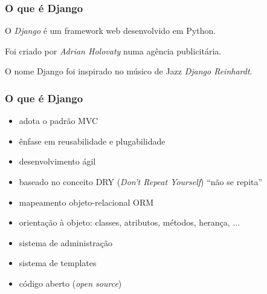 \documentclass[aspectratio=169]{beamer}
\begin{document}
		 
		 

\begin{frame}\frametitle{O que \'e Django}
	O \emph{Django} \'e um framework web desenvolvido em Python.
	
	Foi criado por \emph{Adrian Holovaty} numa ag\^encia publicit\'aria.

	O nome Django foi inspirado no m\'usico de Jazz \emph{Django Reinhardt}.
\end{frame}

\begin{frame}\frametitle{O que \'e Django}
\begin{itemize}
	\item adota o padr\~ao MVC
	\item \^enfase em reusabilidade e plugabilidade
	\item desenvolvimento \'agil
	\item baseado no conceito DRY (\emph{Don't Repeat Yourself}) ``n\~ao se repita''
	\item mapeamento objeto-relacional ORM
	\item orienta\c c\~ao \`a objeto: classes, atributos, m\'etodos, heran\c ca, ...
	\item sistema de administra\c c\~ao
	\item sistema de templates
	\item c\'odigo aberto (\emph{open source})
\end{itemize}
\end{frame}
\end{document}
